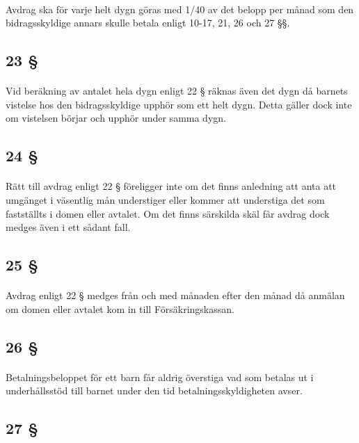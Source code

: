 \documentclass[a4paper,notitlepage,openany,10pt]{book}
\begin{document}
\paragraph*{}
Avdrag ska för varje helt dygn göras med 1/40 av det belopp per månad som den bidragsskyldige annars skulle betala enligt 10-17, 21, 26 och 27 §§.
\subsection*{23 §}
\paragraph*{}
Vid beräkning av antalet hela dygn enligt 22 § räknas även det dygn då barnets vistelse hos den bidragsskyldige upphör som ett helt dygn. Detta gäller dock inte om vistelsen börjar och upphör under samma dygn.
\subsection*{24 §}
\paragraph*{}
Rätt till avdrag enligt 22 § föreligger inte om det finns anledning att anta att umgänget i väsentlig mån understiger eller kommer att understiga det som fastställts i domen eller avtalet. Om det finns särskilda skäl får avdrag dock medges även i ett sådant fall.
\subsection*{25 §}
\paragraph*{}
Avdrag enligt 22 § medges från och med månaden efter den månad då anmälan om domen eller avtalet kom in till Försäkringskassan.
\subsection*{26 §}
\paragraph*{}
Betalningsbeloppet för ett barn får aldrig överstiga vad som betalas ut i underhållsstöd till barnet under den tid betalningsskyldigheten avser.
\subsection*{27 §}
\end{document}
